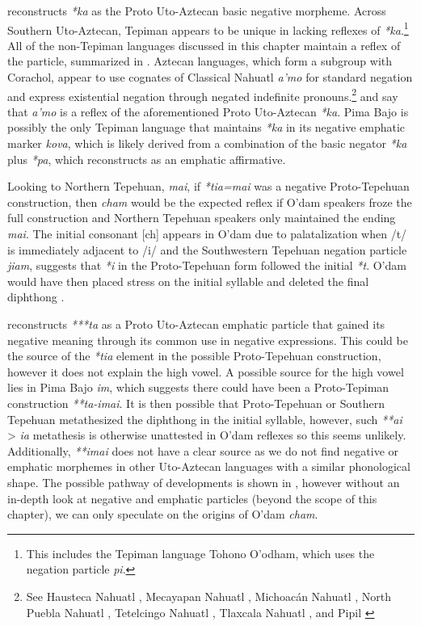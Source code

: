 \documentclass[output=paper,draft,draftmode,colorlinks,citecolor=brown]{langscibook}
\begin{document}
 \citet[32--33]{langacker1977} reconstructs \emph{*ka} as the Proto Uto-Aztecan basic negative morpheme. Across Southern Uto-Aztecan, Tepiman appears to be unique in lacking reflexes of \emph{*ka}.\footnote{This includes the Tepiman language Tohono O'odham, which uses the negation particle \emph{pi}.} All of the non-Tepiman languages discussed in this chapter maintain a reflex of the particle, summarized in . Aztecan languages, which form a subgroup with Corachol, appear to use cognates of Classical Nahuatl \emph{a'mo} \citep{launey1981} for standard negation and express existential negation through negated indefinite pronouns.\footnote{See Hausteca Nahuatl \citep{bellerb1979}, Mecayapan Nahuatl \citep{wolgemuth2002}, Michoacán Nahuatl \citep{sischo1979}, North Puebla Nahuatl \citep{brockway1979}, Tetelcingo Nahuatl \citep{tuggy1979}, Tlaxcala Nahuatl \citep{flores2019}, and Pipil \citep{campbell1985}} \citet{hill2014} and \citet{langacker1977} say that \emph{a'mo} is a reflex of the aforementioned Proto Uto-Aztecan \emph{*ka}. Pima Bajo is possibly the only Tepiman language that maintains \emph{*ka} in its negative emphatic marker \emph{kova}, which is likely derived from a combination of the basic negator \emph{*ka} plus \emph{*pa}, which \citet[32]{langacker1977} reconstructs as an emphatic affirmative.

Looking to Northern Tepehuan, \emph{mai}, if \emph{*tia=mai} was a negative Proto-Te\-pe\-huan construction, then \emph{cham} would be the expected reflex if O’dam speakers froze the full construction and Northern Tepehuan speakers only maintained the ending \emph{mai}. The initial consonant [ch] appears in O’dam due to palatalization when /t/ is immediately adjacent to /i/ and the Southwestern Tepehuan negation particle \emph{jiam}, suggests that \emph{*i} in the Proto-Tepehuan form followed the initial \emph{*t}. O’dam would have then placed stress on the initial syllable and deleted the final diphthong \citep{willett1982}.

\citet[33]{langacker1977} reconstructs \emph{***ta} as a Proto Uto-Aztecan emphatic particle that gained its negative meaning through its common use in negative expressions. This could be the source of the \emph{*tia} element in the possible Proto-Tepehuan construction, however it does not explain the high vowel. A possible source for the high vowel lies in Pima Bajo \emph{im}, which suggests there could have been a Proto-Tepiman construction \emph{**ta-imai}. It is then possible that Proto-Tepehuan or Southern Tepehuan metathesized the diphthong in the initial syllable, however, such \emph{**ai} > \emph{ia} metathesis is otherwise unattested in O’dam reflexes so this seems unlikely. Additionally, \emph{**imai} does not have a clear source as we do not find negative or emphatic morphemes in other Uto-Aztecan languages with a similar phonological shape. The possible pathway of developments is shown in , however without an in-depth look at negative and emphatic particles (beyond the scope of this chapter), we can only speculate on the origins of O’dam \emph{cham}.
\end{document}
